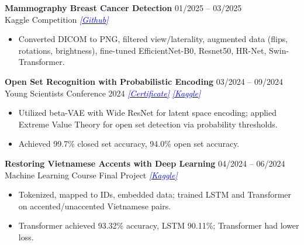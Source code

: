 \documentclass[10pt]{article}
\begin{document}
\vspace{12pt}

\textbf{Mammography Breast Cancer Detection} \hfill 01/2025 -- 03/2025 \\
Kaggle Competition \hfill \href{https://github.com/taitruong256/BreastCancer}{\textcolor{blue}{\textit{[Github]}}}

\begin{itemize}[noitemsep, topsep=0pt, partopsep=0pt, parsep=0pt]
    \item Converted DICOM to PNG, filtered view/laterality, augmented data (flips, rotations, brightness), fine-tuned EfficientNet-B0, Resnet50, HR-Net, Swin-Transformer.
\end{itemize}

\vspace{12pt}

\textbf{Open Set Recognition with Probabilistic Encoding} \hfill 03/2024 -- 09/2024 \\
Young Scientists Conference 2024 \hfill \href{https://drive.google.com/file/d/1l1SqZIbdWwFyhkkkd7IVw5bSU6gou24q/view?usp=sharing}{\textcolor{blue}{\textit{[Certificate]}}} \href{https://www.kaggle.com/code/taitruong256/openset-recognization-pytorch}{\textcolor{blue}{\textit{[Kaggle]}}}

\begin{itemize}[noitemsep, topsep=0pt, partopsep=0pt, parsep=0pt]
    \item Utilized beta-VAE with Wide ResNet for latent space encoding; applied Extreme Value Theory for open set detection via probability thresholds.
    \item Achieved 99.7\% closed set accuracy, 94.0\% open set accuracy.
\end{itemize}

\vspace{12pt}

\textbf{Restoring Vietnamese Accents with Deep Learning} \hfill 04/2024 -- 06/2024 \\
Machine Learning Course Final Project \hfill \href{https://www.kaggle.com/code/taitruong256/diacritic-restoration-for-non-diacritic-vietnamese}{\textcolor{blue}{\textit{[Kaggle]}}}

\begin{itemize}[noitemsep, topsep=0pt, partopsep=0pt, parsep=0pt]
    \item Tokenized, mapped to IDs, embedded data; trained LSTM and Transformer on accented/unaccented Vietnamese pairs.
    \item Transformer achieved 93.32\% accuracy, LSTM 90.11\%; Transformer had lower loss.
\end{itemize}
\end{document}
